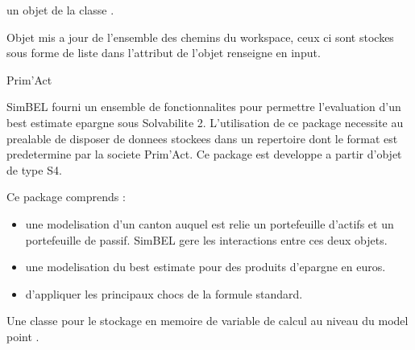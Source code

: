 \documentclass[a4paper]{book}
\begin{document}
%
\begin{Arguments}
\begin{ldescription}
\item[\code{x}] un objet de la classe .
\end{ldescription}
\end{Arguments}
%
\begin{Value}
Objet mis a jour de l'ensemble des chemins du workspace,
ceux ci sont stockes sous forme de liste dans l'attribut  
de l'objet  renseigne en input.
\end{Value}
%
\begin{Author}\relax
Prim'Act
\end{Author}
%
\begin{Description}\relax
SimBEL fourni un ensemble de fonctionnalites pour permettre l'evaluation d'un best
estimate epargne sous Solvabilite 2. L'utilisation de ce package necessite au prealable
de disposer de donnees stockees dans un repertoire dont le format est predetermine par
la societe Prim'Act. Ce package est developpe a partir d'objet de type S4.
\end{Description}
%
\begin{Details}\relax
Ce package comprends :
\begin{itemize}

\item une modelisation d'un canton auquel est relie un portefeuille d'actifs et un portefeuille de passif.
SimBEL gere les interactions entre ces deux objets.
\item une modelisation du best estimate pour des produits d'epargne en euros.
\item d'appliquer les principaux chocs de la formule standard.

\end{itemize}

\end{Details}
%
\begin{Description}\relax
Une classe pour le stockage en memoire de variable de calcul au niveau du model point .
\end{Description}
\end{document}
